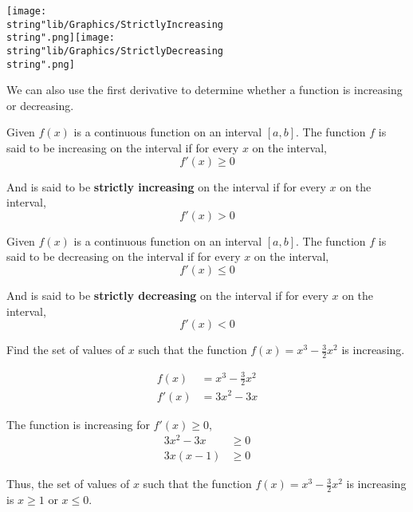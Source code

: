 \documentclass[11pt,a4paper]{book}
\begin{document}
\begin{center}
\texttt{[image: \\string"lib/Graphics/StrictlyIncreasing\\string".png]}\hspace{1cm}\texttt{[image: \\string"lib/Graphics/StrictlyDecreasing\\string".png]}
\par\end{center}

\newpage{}

We can also use the first derivative to determine whether a function
is increasing or decreasing.

\begin{tcolorbox}[colback=blue!5, colframe=black, boxrule=.4pt, sharpish corners]

Given $f(x)$ is a continuous function on an interval $\left[a,b\right]$.
The function $f$ is said to be increasing on the interval if for
every $x$ on the interval,
\[
f'(x)\geq0
\]

And is said to be \textbf{strictly increasing} on the interval if
for every $x$ on the interval,
\[
f'(x)>0
\]
\end{tcolorbox}

\begin{tcolorbox}[colback=blue!5, colframe=black, boxrule=.4pt, sharpish corners]

Given $f(x)$ is a continuous function on an interval $\left[a,b\right]$.
The function $f$ is said to be decreasing on the interval if for
every $x$ on the interval,
\[
f'(x)\leq0
\]

And is said to be \textbf{strictly decreasing} on the interval if
for every $x$ on the interval,
\[
f'(x)<0
\]
\end{tcolorbox}

\begin{example}

Find the set of values of $x$ such that the function ${\displaystyle f\left(x\right)=x^{3}-\frac{3}{2}x^{2}}$
is increasing.

\Solution

\begin{align*}
f\left(x\right) & ={\displaystyle x^{3}-\frac{3}{2}x^{2}}\\
f'\left(x\right) & ={\displaystyle 3x^{2}-3x}
\end{align*}

The function is increasing for $f'\left(x\right)\geq0$,
\begin{align*}
{\displaystyle 3x^{2}-3x} & \geq0\\
3x\left(x-1\right) & \geq0
\end{align*}

Thus, the set of values of $x$ such that the function ${\displaystyle f\left(x\right)=x^{3}-\frac{3}{2}x^{2}}$
is increasing is $x\geq1$ or $x\leq0$.

\end{example}
\end{document}
